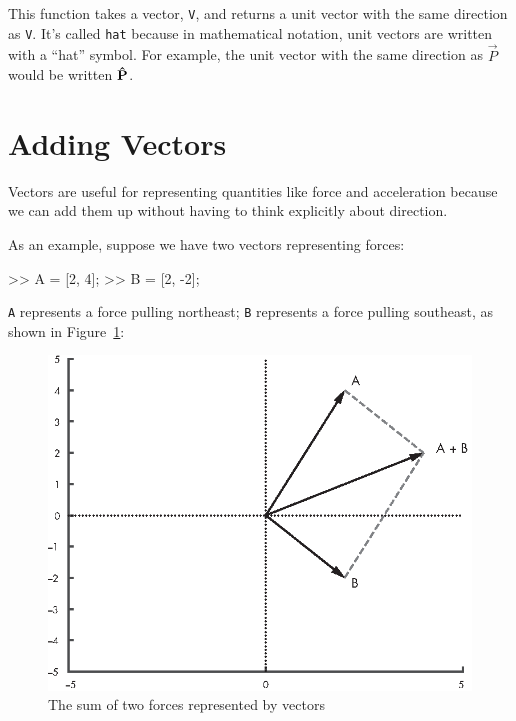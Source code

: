 This function takes a vector, \lstinline{V}, and returns a unit vector with the same direction as \lstinline{V}.  It's called \lstinline{hat} because in mathematical notation, unit vectors are written with a ``hat'' symbol.  
For example, the unit vector with the same direction as $\vec{P}$ would be written $\uvec{P}$. 


\section{Adding Vectors}

Vectors are useful for representing quantities like force and acceleration because we can add them up without having to think explicitly about direction.


As an example, suppose we have two vectors representing forces:

\begin{code}
>> A = [2, 4];
>> B = [2, -2];
\end{code}

\lstinline{A} represents a force pulling northeast; \lstinline{B} represents a force pulling southeast, as shown in Figure~\ref{fig:vector2}:

\begin{figure}[h]
\centerline{\includegraphics[scale=0.8]{images/figure12_01_new.eps}}
\caption{The sum of two forces represented by vectors}
\label{fig:vector2}
\end{figure}

